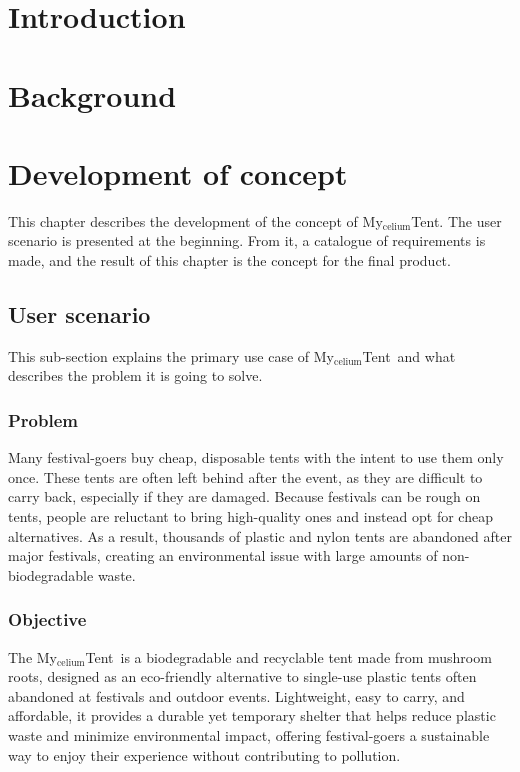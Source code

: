 \documentclass{article}
\newcommand{\myc}{My$_{\text{celium}}$Tent}
\begin{document}
\tableofcontents
\thispagestyle{empty}

\vfill
\section{Introduction}

\newpage

\section{Background}

\newpage

\section{Development of concept}
This chapter describes the development of the concept of \myc.
The user scenario is presented at the beginning. From it, a catalogue
of requirements is made, and the result of this chapter is the
concept for the final product.

\subsection{User scenario}
This sub-section explains the primary use case of \myc\ and what describes the
problem it is going to solve. 

\subsubsection{Problem}
Many festival-goers buy cheap, disposable tents with the intent to use them only once.
These tents are often left behind after the event, as they are difficult to carry back,
especially if they are damaged. Because festivals can be rough on tents, people are
reluctant to bring high-quality ones and instead opt for cheap alternatives. As a result,
thousands of plastic and nylon tents are abandoned after major festivals, creating an
environmental issue with large amounts of non-biodegradable waste.

\subsubsection{Objective}
The \myc\ is a biodegradable and recyclable tent made from mushroom roots, designed
as an eco-friendly alternative to single-use plastic tents often abandoned at festivals
and outdoor events. Lightweight, easy to carry, and affordable, it provides a durable yet
temporary shelter that helps reduce plastic waste and minimize environmental impact,
offering festival-goers a sustainable way to enjoy their experience without contributing
to pollution.
\end{document}
